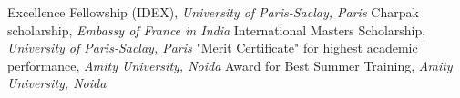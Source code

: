 
\begin{scholarship}
					{Excellence Fellowship (IDEX), \textit{University of Paris-Saclay, Paris}}
					{{Charpak scholarship}, \textit{Embassy of France in India}}
					{International Master\textquotesingle s Scholarship, \textit{University of Paris-Saclay, Paris}}
					{"Merit Certificate" for highest academic performance, \textit{Amity University, Noida}}
					{Award for Best Summer Training, \textit{Amity University, Noida}}
\end{scholarship}